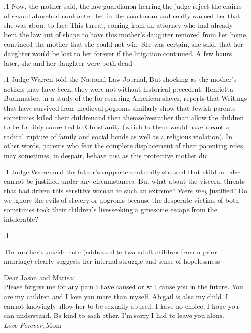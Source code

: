 \documentclass[11pt, twoside]{article}
\begin{document}
{\p.1{%
Now, the mother said, the law guardian\mdash{}on hearing the judge reject
the claims of sexual abuse\mdash{}had confronted her in the courtroom and
coldly warned her that she was about to face  This threat, coming from an attorney who had already bent the law
out of shape to have this mother’s daughter removed from her home,
convinced the mother that she could not win. She was certain, she said,
that her daughter would be lost to her forever if the litigation continued.
A few hours later, she and her daughter were both dead.
}%

\p.1{%
Judge Warren told the National Law Journal,  But shocking as the mother’s actions may have been,
they were not without historical precedent. Henrietta Buckmaster, in
a study of the  for escaping American slaves,
reports that  Writings
that have survived from medieval pogroms similarly show that Jewish
parents sometimes killed their children\mdash{}and then themselves\mdash{}rather
than allow the children to be forcibly converted to Christianity (which
to them would have meant a radical rupture of family and social bonds as
well as a religious violation). In other words, parents who fear the complete displacement of their parenting roles may sometimes, in despair,
behave just as this protective mother did.
}%

\p.1{%
Judge Warren\mdash{}and the father’s supporters\mdash{}naturally stressed that
child murder cannot be justified under any circumstances. But what
about the visceral threats that had driven this sensitive woman to such
an extreme? Were \textit{they} justified? Do we ignore the evils of slavery or
pogroms because the desperate victims of both sometimes took their
children’s lives\mdash{}seeking a gruesome escape from the intolerable?
}%

\p.1{%
The mother’s suicide note (addressed to two adult children from
a prior marriage) clearly suggests her internal struggle and sense of
hopelessness:

\begin{blockQuote}
Dear Jason and Marisa:\\
\hspace*{.3in}Please forgive me for any pain I have caused or will cause you in
the future. You are my children and I love you more than myself.
Abigail is also my child. I cannot knowingly allow her to be sexually
abused. I have no choice. I hope you can understand. Be kind to
each other. I’m sorry I had to leave you alone.\\
\hspace*{3.7in}\textit{Love Forever}, Mom
\end{blockQuote}

}}
\end{document}
